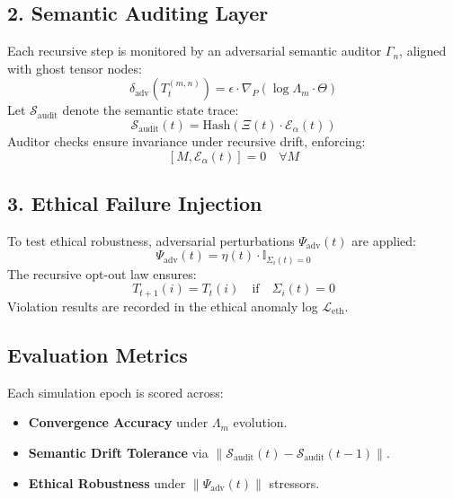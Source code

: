 \documentclass[12pt]{article}
\begin{document}
\subsection{2. Semantic Auditing Layer}

Each recursive step is monitored by an adversarial semantic auditor $\Gamma_n$, aligned with ghost tensor nodes:
\begin{equation}
\delta_{\text{adv}}\left(T^{(m,n)}_t\right) = \epsilon \cdot \nabla_P(\log \Lambda_m \cdot \Theta)
\end{equation}
Let $\mathcal{S}_{\text{audit}}$ denote the semantic state trace:
\begin{equation}
\mathcal{S}_{\text{audit}}(t) = \text{Hash}\left(\Xi(t) \cdot \mathcal{E}_\alpha(t)\right)
\end{equation}
Auditor checks ensure invariance under recursive drift, enforcing:
\[
[M, \mathcal{E}_\alpha(t)] = 0 \quad \forall M
\]

\subsection{3. Ethical Failure Injection}

To test ethical robustness, adversarial perturbations $\Psi_{\text{adv}}(t)$ are applied:
\begin{equation}
\Psi_{\text{adv}}(t) = \eta(t) \cdot \mathbb{I}_{\Sigma_i(t) = 0}
\end{equation}
The recursive opt-out law ensures:
\begin{equation}
T_{t+1}(i) = T_t(i) \quad \text{if} \quad \Sigma_i(t) = 0
\end{equation}
Violation results are recorded in the ethical anomaly log $\mathcal{L}_{\text{eth}}$.

\subsection{Evaluation Metrics}

Each simulation epoch is scored across:
\begin{itemize}
    \item \textbf{Convergence Accuracy} under $\Lambda_m$ evolution.
    \item \textbf{Semantic Drift Tolerance} via $\|\mathcal{S}_{\text{audit}}(t) - \mathcal{S}_{\text{audit}}(t-1)\|$.
    \item \textbf{Ethical Robustness} under $\|\Psi_{\text{adv}}(t)\|$ stressors.
\end{itemize}
\end{document}
